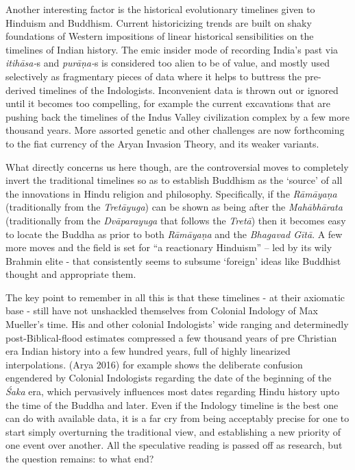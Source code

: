 Another interesting factor is the historical evolutionary timelines given to Hinduism and Buddhism. Current historicizing trends are built on shaky foundations of Western impositions of linear historical sensibilities on the timelines of Indian history. The emic insider mode of recording India’s past via \textit{itihāsa-}s  and \textit{purāṇa-}s is considered too alien to be of value, and mostly used selectively as fragmentary pieces of data where it helps to buttress the pre-derived timelines of the Indologists. Inconvenient data is thrown out or ignored until it becomes too compelling, for example the current excavations that are pushing back the timelines of the Indus Valley civilization complex by a few more thousand years. More assorted genetic and other challenges are now forthcoming to the fiat currency of the Aryan Invasion Theory, and its weaker variants.

What directly concerns us here though, are the controversial moves to completely invert the traditional timelines so as to establish Buddhism as the ‘source’ of all the innovations in Hindu religion and philosophy. Specifically, if the \textit{Rāmāyaṇa} (traditionally from the \textit{Tretāyuga}) can be shown as being after the \textit{Mahābhārata} (traditionally from the \textit{Dvāparayuga} that follows the \textit{Tretā}) then it becomes easy to locate the Buddha as prior to both \textit{Rāmāyaṇa} and the \textit{Bhagavad Gītā}. A few more moves and the field is set for “a reactionary Hinduism” – led by its wily Brahmin elite - that consistently seems to subsume ‘foreign’ ideas like Buddhist thought and appropriate them.

The key point to remember in all this is that these timelines - at their axiomatic base - still have not unshackled themselves from Colonial Indology of Max Mueller’s time. His and other colonial Indologists’ wide ranging and determinedly post-Biblical-flood estimates compressed a few thousand years of pre Christian era Indian history into a few hundred years, full of highly linearized interpolations. (Arya 2016) for example shows the deliberate confusion engendered by Colonial Indologists regarding the date of the beginning of the \textit{Śaka} era, which pervasively influences most dates regarding Hindu history upto the time of the Buddha and later. Even if the Indology timeline is the best one can do with available data, it is a far cry from being acceptably precise for one to start simply overturning the traditional view, and establishing a new priority of one event over another. All the speculative reading is passed off as research, but the question remains: to what end?

